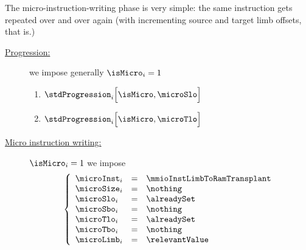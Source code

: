 \begin{center}
\end{center}
The micro-instruction-writing phase is very simple: the same instruction gets repeated over and over again (with incrementing source and target limb offsets, that is.)
\begin{description}
	\item[\underline{Progression:}] \label{mmu: instructions: modexpdata: micro instruction writing: tlo progression}
		we impose generally \If $\isMicro_{i} = 1$ \Then
		\begin{enumerate}
			\item $\stdProgression_{i}\Big[\isMicro, \microSlo \Big]$
			\item $\stdProgression_{i}\Big[\isMicro, \microTlo \Big]$
		\end{enumerate}
	\item[\underline{Micro instruction writing:}]
		\If $\isMicro_{i} = 1$ \Then
		we impose
		\[
			\left\{ \begin{array}{lcl}
				\microInst        _{i} & = & \mmioInstLimbToRamTransplant \\
				\microSize        _{i} & = & \nothing \\
				\microSlo         _{i} & = & \alreadySet \\
				\microSbo         _{i} & = & \nothing \\
				\microTlo         _{i} & = & \alreadySet \\
				\microTbo         _{i} & = & \nothing \\
				\microLimb        _{i} & = & \relevantValue \\
			\end{array} \right.
		\]
\end{description}
